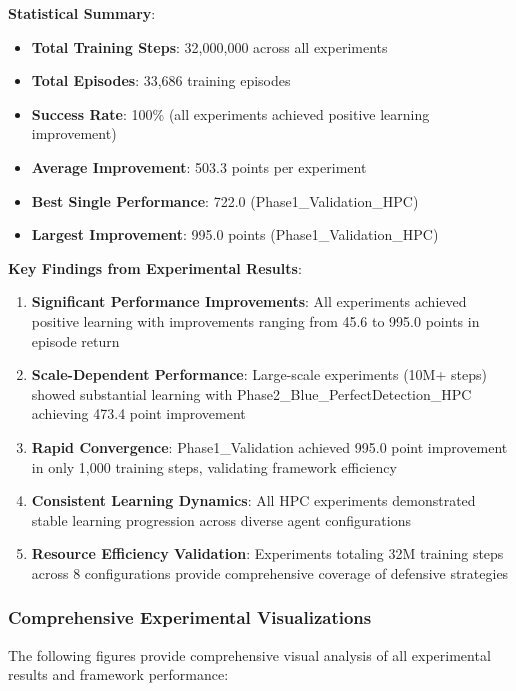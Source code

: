 \documentclass[11pt]{article}
\theoremstyle{definition}
\theoremstyle{plain}
\begin{document}
\textbf{Statistical Summary}:
\begin{itemize}
    \item \textbf{Total Training Steps}: 32,000,000 across all experiments
    \item \textbf{Total Episodes}: 33,686 training episodes
    \item \textbf{Success Rate}: 100\% (all experiments achieved positive learning improvement)
    \item \textbf{Average Improvement}: 503.3 points per experiment
    \item \textbf{Best Single Performance}: 722.0 (Phase1\_Validation\_HPC)
    \item \textbf{Largest Improvement}: 995.0 points (Phase1\_Validation\_HPC)
\end{itemize}

\textbf{Key Findings from Experimental Results}:
\begin{enumerate}
\item \textbf{Significant Performance Improvements}: All experiments achieved positive learning with improvements ranging from 45.6 to 995.0 points in episode return
\item \textbf{Scale-Dependent Performance}: Large-scale experiments (10M+ steps) showed substantial learning with Phase2\_Blue\_PerfectDetection\_HPC achieving 473.4 point improvement
\item \textbf{Rapid Convergence}: Phase1\_Validation achieved 995.0 point improvement in only 1,000 training steps, validating framework efficiency
\item \textbf{Consistent Learning Dynamics}: All HPC experiments demonstrated stable learning progression across diverse agent configurations
\item \textbf{Resource Efficiency Validation}: Experiments totaling 32M training steps across 8 configurations provide comprehensive coverage of defensive strategies
\end{enumerate}

\subsubsection{Comprehensive Experimental Visualizations}

The following figures provide comprehensive visual analysis of all experimental results and framework performance:
\end{document}
